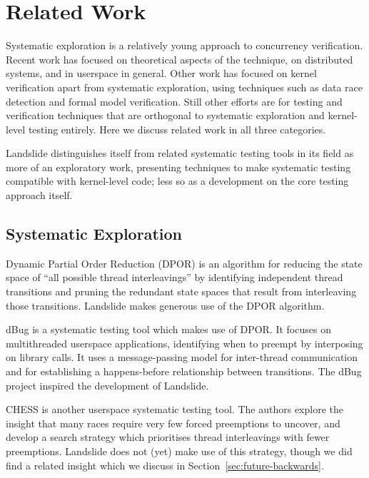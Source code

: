 \chapter{Related Work}


Systematic exploration is a relatively young approach to concurrency verification.
Recent work has focused on theoretical aspects of the technique, on distributed systems, and in userspace in general.
Other work has focused on kernel verification apart from systematic exploration, using techniques such as data race detection and formal model verification.
Still other efforts are for testing and verification techniques that are orthogonal to systematic exploration and kernel-level testing entirely.
Here we discuss related work in all three categories.

Landslide distinguishes itself from related systematic testing tools in its field as more of an exploratory work, presenting techniques to make systematic testing compatible with kernel-level code; less so as a development on the core testing approach itself.

\section{Systematic Exploration}

Dynamic Partial Order Reduction (DPOR)\hspace{0in}\cite{dpor,sdpor,dbug-retreat,distributed-dpor} is an algorithm for reducing the state space of ``all possible thread interleavings'' by identifying independent thread transitions and pruning the redundant state spaces that result from interleaving those transitions. Landslide makes generous use of the DPOR algorithm.

dBug\cite{dbug-ssv} is a systematic testing tool which makes use of DPOR. It focuses on multithreaded userspace applications, identifying when to preempt by interposing on  library calls. It uses a message-passing model for inter-thread communication and for establishing a happens-before relationship between transitions. The dBug project inspired the development of Landslide.

CHESS\cite{chess} is another userspace systematic testing tool. The authors explore the insight that many races require very few forced preemptions to uncover, and develop a search strategy which prioritises thread interleavings with fewer preemptions. Landslide does not (yet) make use of this strategy, though we did find a related insight which we discuss in Section~\ref{sec:future-backwards}.


